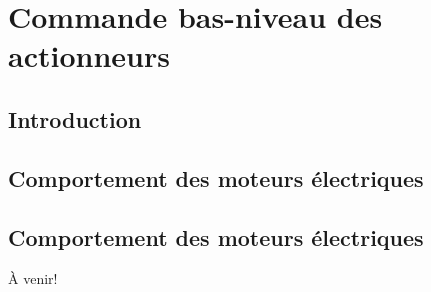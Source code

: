 \chapter{Commande bas-niveau des actionneurs}
\label{sec:actuatorcontrol}


\section{Introduction}


\section{Comportement des moteurs électriques}

\section{Comportement des moteurs électriques}

À venir!